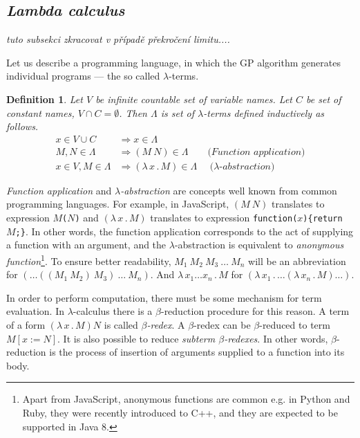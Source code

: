 \documentclass[11pt]{article}
\newtheorem{definition}{Definition}
\newcommand{\Lets}{Let us\xspace}
\newcommand{\lterms}{$\lambda$-terms\xspace}
\newcommand{\then}{\Rightarrow\xspace}
\newcommand{\lamb}[2]{( \lambda \, #1 \, . \, #2 )}
\newcommand{\lam}[2]{\lambda \, #1 \, . \, #2}
\newcommand{\bRedex}{$\beta$-redex\xspace}
\newcommand{\bRedexes}{$\beta$-redexes\xspace}
\newcommand{\red}[1]{{\color{red} #1}}
\begin{document}
\begin{article}
\subsection{\textit{Lambda calculus}}
\red{\textit{tuto subsekci zkracovat v případě překročení limitu....}}

\Lets describe a programming language, 
in which the GP algorithm generates individual programs --- the so called \lterms.

\begin{definition}
Let $V$ be infinite countable set of {\it 
variable names}. Let $C$ be set of {\it constant names}, 
$V \cap C = \emptyset$.	 	
Then $\Lambda$ is set of {\it \lterms} defined inductively as follows.
\begin{align*}
x   \in V \cup C  &\then x     \in \Lambda \\
M,N \in \Lambda   &\then (M~N) \in \Lambda 
\textit{~~~~~~(Function application)} \\
x   \in V , M \in \Lambda &\then \lamb{x}{M} \in \Lambda
\textit{~~~~($\lambda$-abstraction)} 
\end{align*}
\end{definition}

\textit{Function application} and 
\textit{$\lambda$-abstraction} are concepts
well known from common programming languages. 
For example, in JavaScript, 
$(M~N)$ translates to expression \texttt{$M$($N$)} and
$\lamb{x}{M}$ translates to expression \texttt{function($x$)\{return $M$;\}}.
In other words, the function application 
corresponds to the act of supplying a function 
with an argument, and
the $\lambda$-abstraction is equivalent to 
\textit{anonymous function}\footnote{Apart from JavaScript, anonymous functions are common e.g. in Python and Ruby, 
they were recently introduced to C++, and they are expected to be supported in Java 8.}.
To ensure better readability, 
$M_1~M_2~M_3~\dots~M_n$ will be an abbreviation for 
$(\dots((M_1~M_2)~M_3)~\dots~M_n)$.
And $\lam{x_1 \dots x_n }{M}$  for
$\lamb{x_1}{\dots\lamb{x_n}{M}\dots}$.

In order to perform computation, there must be some
mechanism for term evaluation. In $\lambda$-calculus there
is a \mbox{$\beta$-reduction} procedure for this reason.
A term of a form $\lamb{x}{M}N$ is called \textit{\bRedex}.
A \bRedex can be $\beta$-reduced to term $M[x:=N]$. 
It is also possible to reduce \textit{subterm \bRedexes}.
In other words, $\beta$-reduction is the process 
of insertion of arguments supplied to a function into 
its body.


\end{article}
\end{document}
